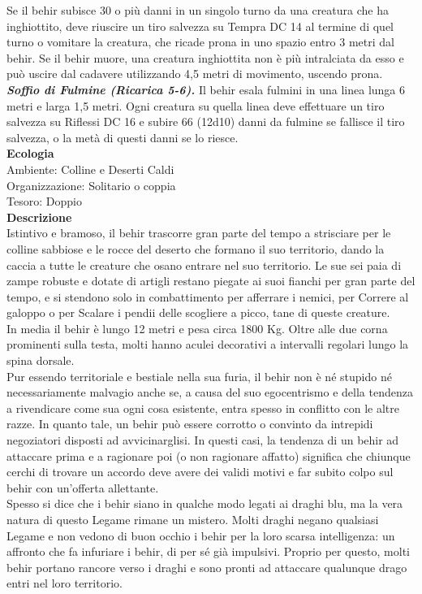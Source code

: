 \begin{multicols}{2}
Se il behir subisce 30 o più danni in un singolo turno da una creatura che ha inghiottito, deve riuscire un tiro salvezza su Tempra DC 14 al termine di quel turno o vomitare la creatura, che ricade prona in uno spazio entro 3 metri dal behir. Se il behir muore, una creatura inghiottita non è più intralciata da esso e può uscire dal cadavere utilizzando 4,5 metri di movimento, uscendo prona.\\
\emph{\textbf{Soffio di Fulmine (Ricarica 5-6).}} Il behir esala fulmini in una linea lunga 6 metri e larga 1,5 metri. Ogni creatura su quella linea deve effettuare un tiro salvezza su Riflessi DC 16 e subire 66 (12d10) danni da fulmine se fallisce il tiro salvezza, o la metà di questi danni se lo riesce.\\
\textbf{Ecologia}\\
Ambiente: Colline e Deserti Caldi\\
Organizzazione: Solitario o coppia\\
Tesoro: Doppio\\
\textbf{Descrizione}\\
Istintivo e bramoso, il behir trascorre gran parte del tempo a strisciare per le colline sabbiose e le rocce del deserto che formano il suo territorio, dando la caccia a tutte le creature che osano entrare nel suo territorio. Le sue sei paia di zampe robuste e dotate di artigli restano piegate ai suoi fianchi per gran parte del tempo, e si stendono solo in combattimento per afferrare i nemici, per Correre al galoppo o per Scalare i pendii delle scogliere a picco, tane di queste creature.\\
In media il behir è lungo 12 metri e pesa circa 1800 Kg. Oltre alle due corna prominenti sulla testa, molti hanno aculei decorativi a intervalli regolari lungo la spina dorsale.\\
Pur essendo territoriale e bestiale nella sua furia, il behir non è né stupido né necessariamente malvagio anche se, a causa del suo egocentrismo e della tendenza a rivendicare come sua ogni cosa esistente, entra spesso in conflitto con le altre razze. In quanto tale, un behir può essere corrotto o convinto da intrepidi negoziatori disposti ad avvicinarglisi. In questi casi, la tendenza di un behir ad attaccare prima e a ragionare poi (o non ragionare affatto) significa che chiunque cerchi di trovare un accordo deve avere dei validi motivi e far subito colpo sul behir con un’offerta allettante.\\
Spesso si dice che i behir siano in qualche modo legati ai draghi blu, ma la vera natura di questo Legame rimane un mistero. Molti draghi negano qualsiasi Legame e non vedono di buon occhio i behir per la loro scarsa intelligenza: un affronto che fa infuriare i behir, di per sé già impulsivi. Proprio per questo, molti behir portano rancore verso i draghi e sono pronti ad attaccare qualunque drago entri nel loro territorio.\\


\end{multicols}

